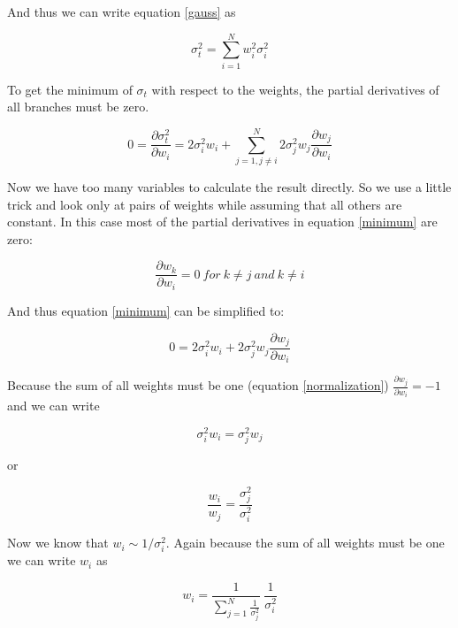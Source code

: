And thus we can write equation \ref{gauss} as

\begin{equation}
\sigma_t^2 = \sum_{i = 1}^{N} w_i^2 \sigma_i^2 \label{sigma_square}
\end{equation}

To get the minimum of $\sigma_t$ with respect to the
weights, the partial derivatives of all branches must
be zero.

\begin{equation}
0 =\frac{\partial \sigma_t^2}{\partial w_i} 
= 2 \sigma_i^2 w_i + \sum_{j = 1, j \neq i}^{N} 2 \sigma_j^2 w_j 
\frac{\partial w_j}{\partial w_i} \label{minimum}
\end{equation}

Now we have too many variables to calculate the result
directly. So we use a little trick and look only at pairs of
weights while assuming that all others are constant. In this
case most of the partial derivatives in equation \ref{minimum}
are zero:

\begin{equation}
\frac{\partial w_k}{\partial w_i} = 0 \ for \ k \neq j \ and \ k \neq i
\end{equation}

And thus equation \ref{minimum} can be simplified to:

\begin{equation}
0 = 2 \sigma_i^2 w_i + 2 \sigma_j^2 w_j 
\frac{\partial w_j}{\partial w_i} \label{min}
\end{equation}

Because the sum of all weights must be one (equation \ref{normalization})
$\frac{\partial w_j}{\partial w_i} = -1$ and we can write

\begin{equation}
\sigma_i^2 w_i = \sigma_j^2 w_j
\end{equation}

or

\begin{equation}
\frac{w_i}{w_j} = \frac{\sigma_j^2}{\sigma_i^2}
\end{equation}

Now we know that $w_i \sim 1/\sigma_i^2$. Again because the sum
of all weights must be one we can write $w_i$ as

\begin{equation}
w_i = \frac{1}{\sum_{j=1}^{N}\frac{1}{\sigma_j^2}} \ \frac{1}{\sigma_i^2}
\end{equation}

